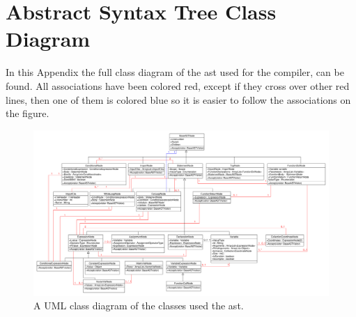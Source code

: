 \chapter{Abstract Syntax Tree Class Diagram}\label{ASTNodes}
In this Appendix the full class diagram of the \acrshort{ast} used for the compiler, can be found.
All associations have been colored red, except if they cross over other red lines, then one of them is colored blue so it is easier to follow the associations on the figure.

\begin{figure}[!ht]
\centering
 \includegraphics[width=1\textwidth]{figures/ClassDiagrams/ASTClassDiagram.pdf} %
\caption{A UML class diagram of the classes used the \acrshort{ast}.}\label{image:ASTNodes}
\vspace{-15pt}
\end{figure}